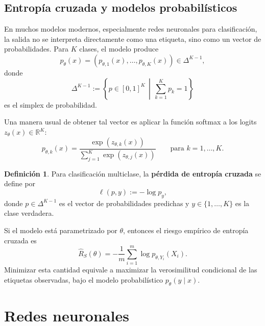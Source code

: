 \documentclass[11pt]{report}
\newenvironment{tcolorbox}[1][]{\par\medskip\noindent\ignorespaces}{\par\medskip}
\theoremstyle{definition}
\newtheorem{definicion}{Definición}[section]
\theoremstyle{plain}
\numberwithin{equation}{section}
\begin{document}
\section{Entropía cruzada y modelos probabilísticos}

En muchos modelos modernos, especialmente redes neuronales para clasificación, la salida no se interpreta directamente como una etiqueta, sino como un vector de probabilidades. Para \(K\) clases, el modelo produce
\begin{equation*}
    p_\theta(x)
    =
    (p_{\theta,1}(x),\ldots,p_{\theta,K}(x))
    \in\Delta^{K-1},
\end{equation*}
donde
\begin{equation*}
    \Delta^{K-1}
    :=
    \left\{
        p\in[0,1]^K
        \,\middle|\,
        \sum_{k=1}^{K}p_k=1
    \right\}
\end{equation*}
es el simplex de probabilidad.

Una manera usual de obtener tal vector es aplicar la función softmax a los logits \(z_\theta(x)\in\mathbb{R}^K\):
\begin{equation*}
    p_{\theta,k}(x)
    =
    \frac{\exp(z_{\theta,k}(x))}
    {\sum_{j=1}^{K}\exp(z_{\theta,j}(x))}
    \qquad
    \text{para } k=1,\ldots,K.
\end{equation*}

\begin{tcolorbox}[colback=blue!8, colframe=blue!8, boxrule=0pt]
\begin{definicion}
Para clasificación multiclase, la \textbf{pérdida de entropía cruzada} se define por
\begin{equation*}
    \ell(p,y)
    :=
    -\log p_y,
\end{equation*}
donde \(p\in\Delta^{K-1}\) es el vector de probabilidades predichas y \(y\in\{1,\ldots,K\}\) es la clase verdadera.
\end{definicion}
\end{tcolorbox}

Si el modelo está parametrizado por \(\theta\), entonces el riesgo empírico de entropía cruzada es
\begin{equation*}
    \widehat{R}_S(\theta)
    =
    -\frac{1}{m}
    \sum_{i=1}^{m}
    \log p_{\theta,Y_i}(X_i).
\end{equation*}
Minimizar esta cantidad equivale a maximizar la verosimilitud condicional de las etiquetas observadas, bajo el modelo probabilístico \(p_\theta(y\mid x)\).

\chapter{Redes neuronales}
\end{document}
